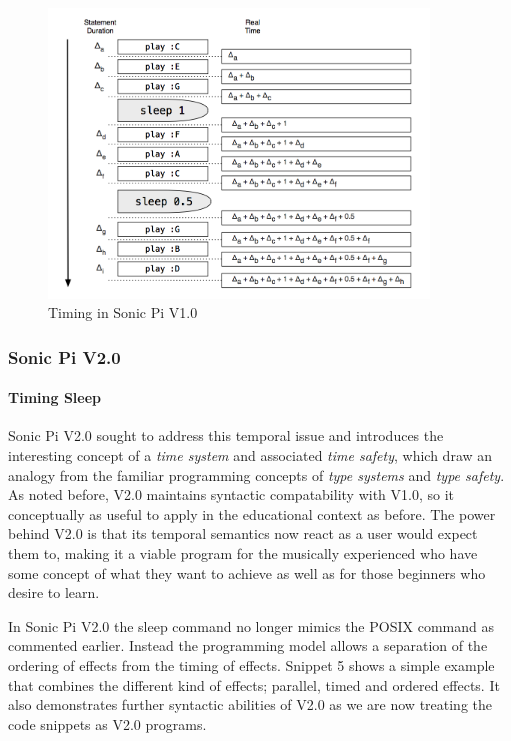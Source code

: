 \documentclass[11pt]{scrartcl}
\begin{document}
\begin{figure}[ht]
	\centering
	\includegraphics[width=0.9\textwidth]{images/sonic-one.png}
	\caption{Timing in Sonic Pi V1.0}
\end{figure}


\subsubsection{Sonic Pi V2.0}

\paragraph{Timing Sleep}
Sonic Pi V2.0 sought to address this temporal issue and introduces the 
interesting concept of a \emph{time system} and associated \emph{time safety}, 
which draw an analogy from the familiar programming concepts of \emph{type 
systems} and \emph{type safety}. As noted before, V2.0 maintains syntactic 
compatability with V1.0, so it conceptually as useful to apply in the 
educational context as before. The power behind V2.0 is that its temporal 
semantics now react as a user would expect them to, making it a viable program 
for the musically experienced who have some concept of what they want to 
achieve as well as for those beginners who desire to learn.

In Sonic Pi V2.0 the sleep command no longer mimics the POSIX command as 
commented earlier. Instead the programming model allows a separation of the 
ordering of effects from the timing of effects. Snippet 5 shows a simple 
example that combines the different kind of effects; parallel, timed and 
ordered effects. It also demonstrates further syntactic abilities of V2.0 as 
we are now treating the code snippets as V2.0 programs.
\end{document}
